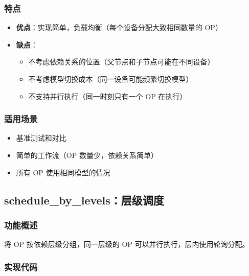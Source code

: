 \documentclass[12pt,a4paper]{article}
\begin{document}
\subsubsection{特点}

\begin{itemize}
    \item \textbf{优点}：实现简单，负载均衡（每个设备分配大致相同数量的 OP）
    \item \textbf{缺点}：
    \begin{itemize}
        \item 不考虑依赖关系的位置（父节点和子节点可能在不同设备）
        \item 不考虑模型切换成本（同一设备可能频繁切换模型）
        \item 不支持并行执行（同一时刻只有一个 OP 在执行）
    \end{itemize}
\end{itemize}

\subsubsection{适用场景}

\begin{itemize}
    \item 基准测试和对比
    \item 简单的工作流（OP 数量少，依赖关系简单）
    \item 所有 OP 使用相同模型的情况
\end{itemize}

\subsection{schedule\_by\_levels：层级调度}

\subsubsection{功能概述}

将 OP 按依赖层级分组，同一层级的 OP 可以并行执行，层内使用轮询分配。

\subsubsection{实现代码}
\end{document}
